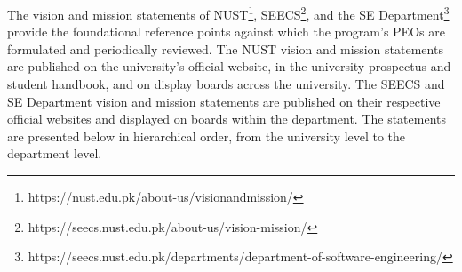 The vision and mission statements of NUST\footnote{https://nust.edu.pk/about-us/visionandmission/}, SEECS\footnote{https://seecs.nust.edu.pk/about-us/vision-mission/}, and the SE Department\footnote{https://seecs.nust.edu.pk/departments/department-of-software-engineering/} provide the foundational reference points against which the program's PEOs are formulated and periodically reviewed. The NUST vision and mission statements are published on the university's official website, in the university prospectus and student handbook, and on display boards across the university. The SEECS and SE Department vision and mission statements are published on their respective official websites and displayed on boards within the department. The statements are presented below in hierarchical order, from the university level to the department level.

